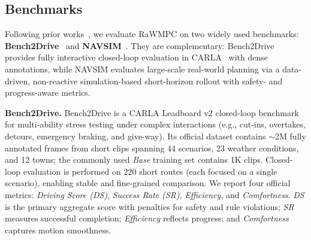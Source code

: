 \documentclass[twocolumn]{template}
\theoremstyle{thmstyleone}%
\theoremstyle{thmstyletwo}%
\theoremstyle{thmstylethree}%
\begin{document}
\subsection{Benchmarks}

Following prior works~\cite{WoTE,Drivedpo,HydraNeXt}, we evaluate RaWMPC on two widely used benchmarks: \textbf{Bench2Drive}~\cite{Bench2drive} and \textbf{NAVSIM}~\cite{Navsim}.
They are complementary: Bench2Drive provides fully interactive closed-loop evaluation in CARLA~\cite{Carla} with dense annotations, while NAVSIM evaluates large-scale real-world planning via a data-driven, non-reactive simulation-based short-horizon rollout with safety- and progress-aware metrics.

\noindent
\textbf{Bench2Drive.}
Bench2Drive is a CARLA Leadboard v2 closed-loop benchmark for multi-ability stress testing under complex interactions (e.g., cut-ins, overtakes, detours, emergency braking, and give-way).
Its official dataset contains $\sim$2M fully annotated frames from short clips spanning 44 scenarios, 23 weather conditions, and 12 towns; the commonly used \textit{Base} training set contains 1K clips.
Closed-loop evaluation is performed on 220 short routes (each focused on a single scenario), enabling stable and fine-grained comparison.
We report four official metrics: \textit{Driving Score (DS)}, \textit{Success Rate (SR)}, \textit{Efficiency}, and \textit{Comfortness}.
\textit{DS} is the primary aggregate score with penalties for safety and rule violations; \textit{SR} measures successful completion; \textit{Efficiency} reflects progress; and \textit{Comfortness} captures motion smoothness.
\end{document}
